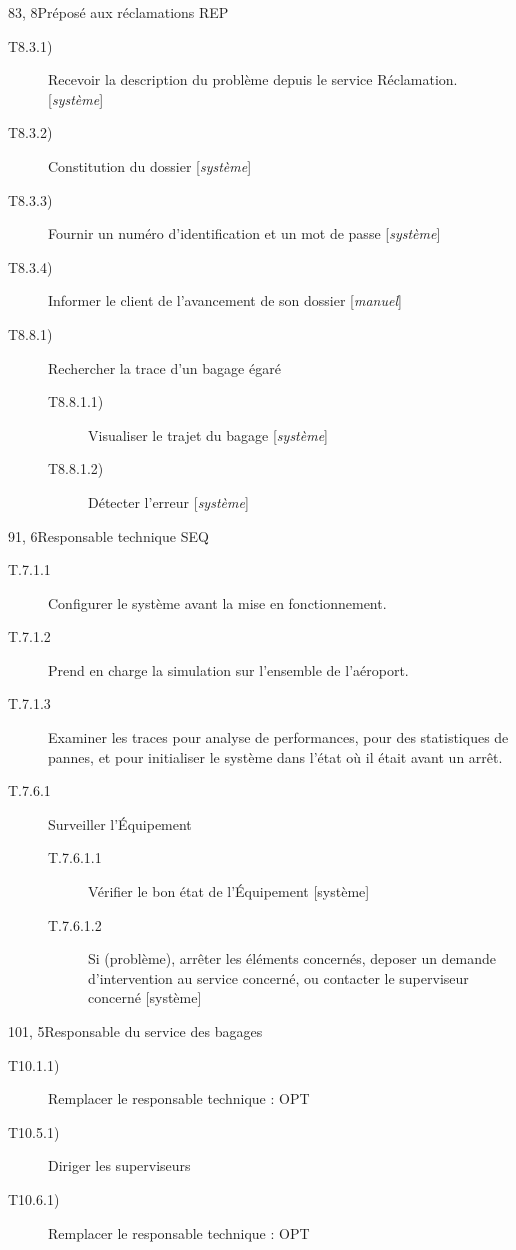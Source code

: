 \dta
{8}{3, 8}{Préposé aux réclamations}
{REP}
{
\begin{description}
	\item [T8.3.1)] Recevoir la description du problème depuis le service \og Réclamation\fg. [\textsl{système}]
	\item [T8.3.2)] Constitution du dossier [\textsl{système}] 
	\item [T8.3.3)] Fournir un numéro d'identification et un mot de passe [\textsl{système}]
	\item [T8.3.4)] Informer le client de l'avancement de son dossier [\textsl{manuel}]

	\item [T8.8.1)] Rechercher la trace d'un bagage égaré
	\begin{description}
		\item [T8.8.1.1)] Visualiser le trajet du bagage [\textsl{système}]
		\item [T8.8.1.2)] Détecter l'erreur [\textsl{système}]
	\end{description}
\end{description}
}

{9}{1, 6}{Responsable technique}
{SEQ}
{
\begin{description}
	\item[T.7.1.1] Configurer le système avant la mise en fonctionnement.
	\item[T.7.1.2] Prend en charge la simulation sur l'ensemble de l'aéroport.
	\item[T.7.1.3] Examiner les traces pour analyse de performances, pour des statistiques de pannes, et pour initialiser le système dans l'état où il était avant un arrêt.

	\item[T.7.6.1] Surveiller l'Équipement
	\begin{description}
		\item[T.7.6.1.1] Vérifier le bon état de l'Équipement [système]
		\item[T.7.6.1.2] Si (problème), arrêter les éléments concernés, deposer un
		demande d'intervention au service concerné, ou contacter le superviseur concerné [système]
	\end{description}
\end{description}
}

\dta
{10}{1, 5}{Responsable du service des bagages}
{
\begin{description}
	\item [T10.1.1)] Remplacer le responsable technique : OPT
	
	\item [T10.5.1)] Diriger les superviseurs

	\item [T10.6.1)] Remplacer le responsable technique : OPT
\end{description}
}

